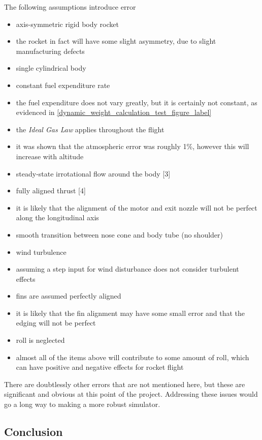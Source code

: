 \documentclass[]{article}
\begin{document}
The following assumptions introduce error

\begin{itemize}
\item
  axis-symmetric rigid body rocket
\item
  the rocket in fact will have some slight asymmetry, due to slight
  manufacturing defects
\item
  single cylindrical body
\item
  constant fuel expenditure rate
\item
  the fuel expenditure does not vary greatly, but it is certainly not
  constant, as evidenced in
  \ref{dynamic_weight_calculation_test_figure_label}
\item
  the \emph{Ideal Gas Law} applies throughout the flight
\item
  it was shown that the atmospheric error was roughly 1\%, however this
  will increase with altitude
\item
  steady-state irrotational flow around the body {[}3{]}
\item
  fully aligned thrust {[}4{]}
\item
  it is likely that the alignment of the motor and exit nozzle will not
  be perfect along the longitudinal axis
\item
  smooth transition between nose cone and body tube (no shoulder)
\item
  wind turbulence
\item
  assuming a step input for wind disturbance does not consider turbulent
  effects
\item
  fins are assumed perfectly aligned
\item
  it is likely that the fin alignment may have some small error and that
  the edging will not be perfect
\item
  roll is neglected
\item
  almost all of the items above will contribute to some amount of roll,
  which can have positive and negative effects for rocket flight
\end{itemize}

There are doubtlessly other errors that are not mentioned here, but
these are significant and obvious at this point of the project.
Addressing these issues would go a long way to making a more robust
simulator.

\subsection{Conclusion}\label{conclusion}
\end{document}
